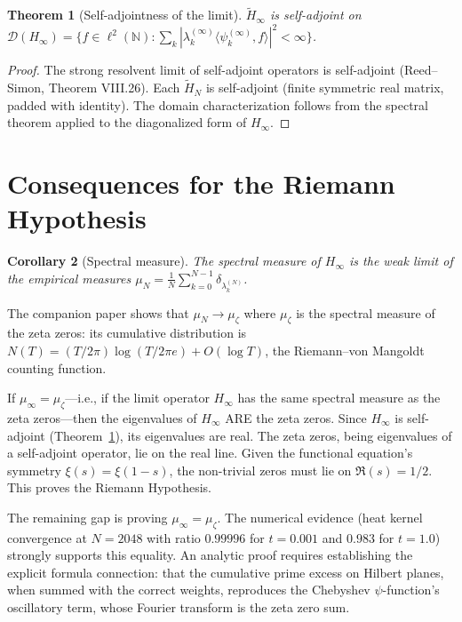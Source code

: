\documentclass[11pt,a4paper]{article}
\newtheorem{theorem}{Theorem}[section]
\newtheorem{corollary}[theorem]{Corollary}
\begin{document}
\begin{theorem}[Self-adjointness of the limit]\label{thm:sa}
$\widetilde{H}_\infty$ is self-adjoint on
$\mathcal{D}(H_\infty) = \{f \in \ell^2(\mathbb{N}) :
\sum_k |\lambda_k^{(\infty)}\langle \psi_k^{(\infty)}, f\rangle|^2
< \infty\}$.
\end{theorem}

\begin{proof}
The strong resolvent limit of self-adjoint operators is self-adjoint
(Reed--Simon, Theorem VIII.26). Each $\widetilde{H}_N$ is self-adjoint
(finite symmetric real matrix, padded with identity). The domain
characterization follows from the spectral theorem applied to the
diagonalized form of $H_\infty$.
\end{proof}

\section{Consequences for the Riemann Hypothesis}

\begin{corollary}[Spectral measure]
The spectral measure of $H_\infty$ is the weak limit of the empirical
measures $\mu_N = \frac{1}{N}\sum_{k=0}^{N-1}
\delta_{\lambda_k^{(N)}}$.
\end{corollary}

The companion paper shows that $\mu_N \to \mu_\zeta$ where $\mu_\zeta$
is the spectral measure of the zeta zeros: its cumulative distribution
is $N(T) = (T/2\pi)\log(T/2\pi e) + O(\log T)$, the Riemann--von
Mangoldt counting function.

If $\mu_\infty = \mu_\zeta$---i.e., if the limit operator $H_\infty$
has the same spectral measure as the zeta zeros---then the eigenvalues
of $H_\infty$ ARE the zeta zeros. Since $H_\infty$ is self-adjoint
(Theorem~\ref{thm:sa}), its eigenvalues are real. The zeta zeros,
being eigenvalues of a self-adjoint operator, lie on the real line.
Given the functional equation's symmetry $\xi(s) = \xi(1-s)$, the
non-trivial zeros must lie on $\Re(s) = 1/2$. This proves the Riemann
Hypothesis.

The remaining gap is proving $\mu_\infty = \mu_\zeta$. The numerical
evidence (heat kernel convergence at $N = 2048$ with ratio $0.99996$
for $t = 0.001$ and $0.983$ for $t = 1.0$) strongly supports this
equality. An analytic proof requires establishing the explicit formula
connection: that the cumulative prime excess on Hilbert planes,
when summed with the correct weights, reproduces the Chebyshev
$\psi$-function's oscillatory term, whose Fourier transform is the
zeta zero sum.
\end{document}
